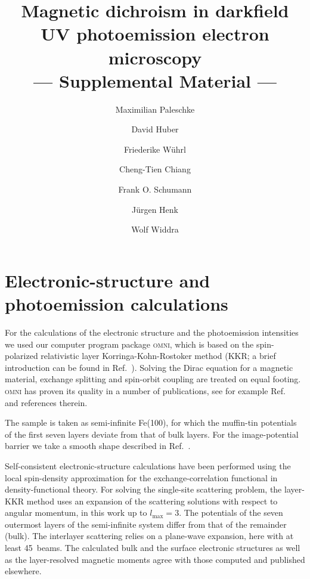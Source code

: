 \documentclass[amsfonts, amssymb, amsmath, preprint, showkeys, twoside, prl, superscriptaddress, aps]{revtex4-2}
\begin{document}
 

\title{Magnetic dichroism in darkfield UV photoemission electron microscopy  \\ --- Supplemental Material ---}

\author{Maximilian Paleschke}
\author{David Huber}
\author{Friederike Wührl}

\author{Cheng-Tien Chiang}

\author{Frank O. Schumann}

\author{Jürgen Henk}
\author{Wolf Widdra}

\maketitle

\section{Electronic-structure and photoemission calculations}
For the calculations of the electronic structure and the photoemission intensities we used our computer program package \textsc{omni}, which is based on the spin-polarized relativistic layer Korringa-Kohn-Rostoker method (KKR; a brief introduction can be found in Ref.~\nocite{Nalwa01a}). Solving the Dirac equation for a magnetic material, exchange splitting and spin-orbit coupling are treated on equal footing. \textsc{omni} has proven its quality in a number of publications, see for example Ref.~ and references therein.

The sample is taken as semi-infinite Fe(100), for which the muffin-tin potentials of the first seven layers deviate from that of bulk layers. For the image-potential barrier we take a smooth shape described in Ref.~.

Self-consistent electronic-structure calculations have been performed using the local spin-density approximation for the exchange-correlation functional in density-functional theory. For solving the single-site scattering problem, the layer-KKR method uses an expansion of the scattering solutions with respect to angular momentum, in this work up to $l_{\mathrm{max}} = 3$. The potentials of the seven outermost layers of the semi-infinite system differ from that of the remainder (bulk). The interlayer scattering relies on a plane-wave expansion, here with at least 45~beams. The calculated bulk and the surface electronic structures as well as the layer-resolved magnetic moments agree with those computed and published elsewhere. 
\end{document}
